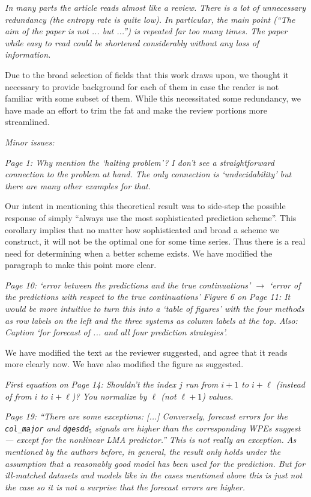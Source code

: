 \documentclass[12pt]{article}
\newcommand{\alert}[1]{{\color{red}#1}}
\begin{document}
\emph{In many parts the article reads almost like a review. There is a lot of
unnecessary redundancy (the entropy rate is quite low). In particular, the main
point (``The aim of the paper is not ... but ...'') is repeated far too many
times. The paper while easy to read could be shortened considerably without any
loss of information.}

Due to the broad selection of fields that this work draws upon, we thought it
necessary to provide background for each of them in case the reader is not
familiar with some subset of them. While this necessitated some redundancy,
\alert{we have made an effort to trim the fat and make the review portions more
streamlined.}

\noindent\emph{Minor issues:}

\emph{Page 1: Why mention the `halting problem'? I don't see a straightforward
connection to the problem at hand. The only connection is `undecidability' but
there are many other examples for that.}

Our intent in mentioning this theoretical result was to side-step the possible
response of simply ``always use the most sophisticated prediction scheme''. This
corollary implies that no matter how sophisticated and broad a scheme we
construct, it will not be the optimal one for some time series. Thus there is a
real need for determining when a better scheme exists. \alert{We have modified
the paragraph to make this point more clear.}

\emph{Page 10: `error between the predictions and the true continuations'
$\rightarrow$ `error of the predictions with respect to the true continuations'
Figure 6 on Page 11: It would be more intuitive to turn this into a `table of
figures' with the four methods as row labels on the left and the three systems
as column labels at the top. Also: Caption `for forecast of ... and all four
prediction strategies'.}

We have modified the text as the reviewer suggested, and agree that it reads
more clearly now. \alert{We have also modified the figure as suggested.}

\emph{First equation on Page 14: Shouldn't the index $j$ run from $i+1$ to
$i+\ell$ (instead of from $i$ to $i+\ell$)? You normalize by $\ell$ (not
$\ell+1$) values.}

\emph{Page 19: ``There are some exceptions: [...] Conversely, forecast errors
for the \texttt{col\_major} and \texttt{dgesdd$_5$} signals are higher than the
corresponding WPEs suggest --- except for the nonlinear LMA predictor.'' This is
not really an exception. As mentioned by the authors before, in general, the
result only holds under the assumption that a reasonably good model has been
used for the prediction. But for ill-matched datasets and models like in the
cases mentioned above this is just not the case so it is not a surprise that the
forecast errors are higher.}
\end{document}
